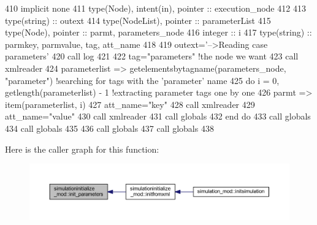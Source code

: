 \begin{DoxyCode}
410     \textcolor{keywordtype}{implicit none}
411     \textcolor{keywordtype}{type}(Node), \textcolor{keywordtype}{intent(in)}, \textcolor{keywordtype}{pointer} :: execution\_node
412 
413     \textcolor{keywordtype}{type}(string) :: outext
414     \textcolor{keywordtype}{type}(NodeList), \textcolor{keywordtype}{pointer} :: parameterList
415     \textcolor{keywordtype}{type}(Node), \textcolor{keywordtype}{pointer} :: parmt, parameters\_node
416     \textcolor{keywordtype}{integer} :: i
417     \textcolor{keywordtype}{type}(string) :: parmkey, parmvalue, tag, att\_name
418 
419     outext=\textcolor{stringliteral}{'-->Reading case parameters'}
420     \textcolor{keyword}{call }log%
421 
422     tag=\textcolor{stringliteral}{"parameters"}    \textcolor{comment}{!the node we want}
423     \textcolor{keyword}{call }xmlreader%
424     parameterlist => getelementsbytagname(parameters\_node, \textcolor{stringliteral}{"parameter"})       \textcolor{comment}{!searching for tags with the
       'parameter' name}
425     \textcolor{keywordflow}{do} i = 0, getlength(parameterlist) - 1                          \textcolor{comment}{!extracting parameter tags one by one}
426         parmt => item(parameterlist, i)
427         att\_name=\textcolor{stringliteral}{"key"}
428         \textcolor{keyword}{call }xmlreader%
429         att\_name=\textcolor{stringliteral}{"value"}
430         \textcolor{keyword}{call }xmlreader%
431         \textcolor{keyword}{call }globals%
432 \textcolor{keywordflow}{    end do}
433     \textcolor{keyword}{call }globals%
434     \textcolor{keyword}{call }globals%
435     
436     \textcolor{keyword}{call }globals%
437     \textcolor{keyword}{call }globals%
438 
\end{DoxyCode}
Here is the caller graph for this function\+:\nopagebreak
\begin{figure}[H]
\begin{center}
\leavevmode
\includegraphics[width=350pt]{namespacesimulationinitialize__mod_a0b32e8c950fc615198d1e47ba1d36cd6_icgraph}
\end{center}
\end{figure}
\mbox{\label{namespacesimulationinitialize__mod_a532cb4960e93dc27cff5dc2e04afe070}} 
